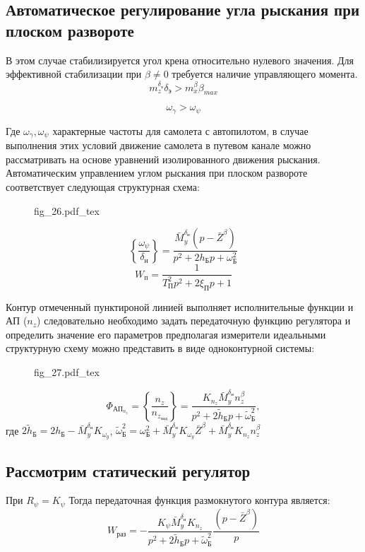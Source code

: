 \documentclass{article}
\begin{document}
\subsection{Автоматическое регулирование угла рыскания при плоском развороте}
В этом случае стабилизируется угол крена относительно нулевого значения. Для эффективной стабилизации при $\beta \neq 0$ требуется наличие управляющего момента.
\[
m_z^{\delta_э} \delta_{э} > m_x^\beta \beta_{max}
\]

\[
\omega_{\gamma} > \omega_{\psi}
\]

Где $\omega_{\gamma}, \omega_{\psi}$ характерные частоты для самолета с автопилотом, в случае выполнения этих условий движение самолета в путевом канале можно рассматривать на основе уравнений изолированного движения рыскания. Автоматическим управлением углом рыскания при плоском развороте соответствует следующая структурная схема:

\begin{figure}[H]
\centering
{fig_26.pdf_tex}
\end{figure}

\[
\left\{\frac{\omega_{\psi}}{\delta_н}\right\} =\frac{\bar{M}_y^{\delta_{н}}(p - \bar{Z}^\beta)}{p^2 + 2h_Б p + \omega_Б^2} 
\]
\[
W_п = \frac{1}{T_П^2 p^2 + 2\xi_П p + 1}
\]

Контур отмеченный пунктироной линией выполняет исполнительные функции и АП ($n_z$) следовательно необходимо задать передаточную функцию регулятора и определить значение его параметров предполагая измерители идеальными структурную схему можно представить в виде одноконтурной системы:

\begin{figure}[H]
\centering
{fig_27.pdf_tex}
\end{figure}


\[
\Phi_{АП_{n_z}} = \left\{\frac{n_z}{n_{z_{зад}}} \right\} =\frac{K_{n_z}\bar{M}_y^{\delta_н} n_z^\beta}{p^2 + 2 \tilde{h}_Б p + \tilde{\omega}_{Б}^2},
\]
где $2\tilde{h}_Б = 2h_Б -\bar{M}_y^{\delta_н} K_{{\omega}_y}$, $\tilde{\omega}_Б^2 = \omega_Б^2 +\bar{M}_y^{\delta_н}K_{\omega_y}\bar{Z}^\beta + \bar{M}_y^{\delta_н} K_{n_z}n_z^\beta$

\subsection{Рассмотрим статический регулятор}
При $R_\psi = K_\psi$
Тогда передаточная функция размокнутого контура является:
\[
W_{раз} = -\frac{K_{\psi} \bar{M}_y^{\delta_н} K_{n_z}}{p^2 + 2 \tilde{h}_Б p + \tilde{\omega}_{Б}^2} \frac{(p - \bar{Z}^\beta)}{p}  
\]
\end{document}
